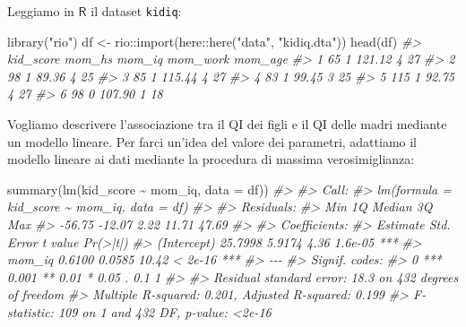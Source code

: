 \documentclass[
  11pt,
]{krantz}
\makeatletter
\newenvironment{Shaded}{\begin{snugshade}}{\end{snugshade}}
\newcommand{\AttributeTok}[1]{\textcolor[rgb]{0.61,0.61,0.61}{#1}}
\newcommand{\CommentTok}[1]{\textcolor[rgb]{0.37,0.37,0.37}{\textit{#1}}}
\newcommand{\FunctionTok}[1]{\textcolor[rgb]{0,0,0}{#1}}
\newcommand{\NormalTok}[1]{#1}
\newcommand{\OtherTok}[1]{\textcolor[rgb]{0.37,0.37,0.37}{#1}}
\newcommand{\SpecialCharTok}[1]{\textcolor[rgb]{0,0,0}{#1}}
\newcommand{\StringTok}[1]{\textcolor[rgb]{0.5,0.5,0.5}{#1}}
\newenvironment{kframe}{%
\medskip{}
\setlength{\fboxsep}{.8em}
 \def\at@end@of@kframe{}%
 \ifinner\ifhmode%
  \def\at@end@of@kframe{\end{minipage}}%
  \begin{minipage}{\columnwidth}%
 \fi\fi%
 \def\FrameCommand##1{\hskip\@totalleftmargin \hskip-\fboxsep
 \colorbox{shadecolor}{##1}\hskip-\fboxsep
     \hskip-\linewidth \hskip-\@totalleftmargin \hskip\columnwidth}%
 \MakeFramed {\advance\hsize-\width
   \@totalleftmargin\z@ \linewidth\hsize
   \@setminipage}}%
 {\par\unskip\endMakeFramed%
 \at@end@of@kframe}
\renewenvironment{Shaded}{\begin{kframe}}{\end{kframe}}
\makeatother
\begin{document}
Leggiamo in \(\textsf{R}\) il dataset \texttt{kidiq}:

\begin{Shaded}
\begin{Highlighting}[]
\FunctionTok{library}\NormalTok{(}\StringTok{"rio"}\NormalTok{)}
\NormalTok{df }\OtherTok{\textless{}{-}}\NormalTok{ rio}\SpecialCharTok{::}\FunctionTok{import}\NormalTok{(here}\SpecialCharTok{::}\FunctionTok{here}\NormalTok{(}\StringTok{"data"}\NormalTok{, }\StringTok{"kidiq.dta"}\NormalTok{))}
\FunctionTok{head}\NormalTok{(df)}
\CommentTok{\#\textgreater{}   kid\_score mom\_hs mom\_iq mom\_work mom\_age}
\CommentTok{\#\textgreater{} 1        65      1 121.12        4      27}
\CommentTok{\#\textgreater{} 2        98      1  89.36        4      25}
\CommentTok{\#\textgreater{} 3        85      1 115.44        4      27}
\CommentTok{\#\textgreater{} 4        83      1  99.45        3      25}
\CommentTok{\#\textgreater{} 5       115      1  92.75        4      27}
\CommentTok{\#\textgreater{} 6        98      0 107.90        1      18}
\end{Highlighting}
\end{Shaded}

Vogliamo descrivere l'associazione tra il QI dei figli e il QI delle madri mediante un modello lineare. Per farci un'idea del valore dei parametri, adattiamo il modello lineare ai dati mediante la procedura di massima verosimiglianza:

\begin{Shaded}
\begin{Highlighting}[]
\FunctionTok{summary}\NormalTok{(}\FunctionTok{lm}\NormalTok{(kid\_score }\SpecialCharTok{\textasciitilde{}}\NormalTok{ mom\_iq, }\AttributeTok{data =}\NormalTok{ df))}
\CommentTok{\#\textgreater{} }
\CommentTok{\#\textgreater{} Call:}
\CommentTok{\#\textgreater{} lm(formula = kid\_score \textasciitilde{} mom\_iq, data = df)}
\CommentTok{\#\textgreater{} }
\CommentTok{\#\textgreater{} Residuals:}
\CommentTok{\#\textgreater{}    Min     1Q Median     3Q    Max }
\CommentTok{\#\textgreater{} {-}56.75 {-}12.07   2.22  11.71  47.69 }
\CommentTok{\#\textgreater{} }
\CommentTok{\#\textgreater{} Coefficients:}
\CommentTok{\#\textgreater{}             Estimate Std. Error t value Pr(\textgreater{}|t|)    }
\CommentTok{\#\textgreater{} (Intercept)  25.7998     5.9174    4.36  1.6e{-}05 ***}
\CommentTok{\#\textgreater{} mom\_iq        0.6100     0.0585   10.42  \textless{} 2e{-}16 ***}
\CommentTok{\#\textgreater{} {-}{-}{-}}
\CommentTok{\#\textgreater{} Signif. codes:  }
\CommentTok{\#\textgreater{} 0 \textquotesingle{}***\textquotesingle{} 0.001 \textquotesingle{}**\textquotesingle{} 0.01 \textquotesingle{}*\textquotesingle{} 0.05 \textquotesingle{}.\textquotesingle{} 0.1 \textquotesingle{} \textquotesingle{} 1}
\CommentTok{\#\textgreater{} }
\CommentTok{\#\textgreater{} Residual standard error: 18.3 on 432 degrees of freedom}
\CommentTok{\#\textgreater{} Multiple R{-}squared:  0.201,  Adjusted R{-}squared:  0.199 }
\CommentTok{\#\textgreater{} F{-}statistic:  109 on 1 and 432 DF,  p{-}value: \textless{}2e{-}16}
\end{Highlighting}
\end{Shaded}
\end{document}
